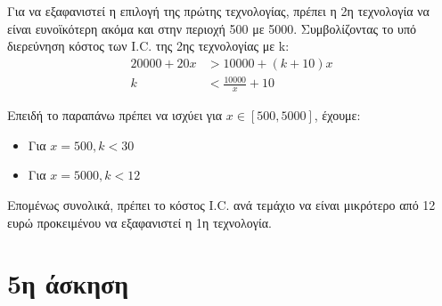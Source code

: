 \documentclass[a4paper]{article}
\begin{document}
Για να εξαφανιστεί η επιλογή της πρώτης τεχνολογίας, πρέπει η 2η τεχνολογία να είναι ευνοϊκότερη ακόμα και στην περιοχή 500 με 5000. Συμβολίζοντας το υπό διερεύνηση κόστος των I.C. της 2ης τεχνολογίας με k:
\begin{align*}
	20000+20x &> 10000 + (k+10)x \\
	k &< \frac{10000}{x}+10 
\end{align*}

Επειδή το παραπάνω πρέπει να ισχύει για $ x \in [500,5000] $, έχουμε:

\begin{itemize}
	\item Για $x = 500, k < 30$
	\item Για $x = 5000, k < 12$
\end{itemize}

Επομένως συνολικά, πρέπει το κόστος I.C. ανά τεμάχιο να είναι μικρότερο από 12 ευρώ προκειμένου να εξαφανιστεί η 1η τεχνολογία.

\section*{5η άσκηση}


\end{document}
